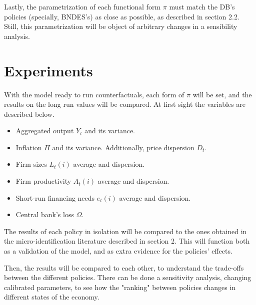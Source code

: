 \documentclass[12pt]{article}
\begin{document}
Lastly, the parametrization of each functional form $\pi$ must match the DB's policies (specially, BNDES's) as close as possible, as described in section 2.2. Still, this parametrization will be object of arbitrary changes in a sensibility analysis.



\section{Experiments}

With the model ready to run counterfactuals, each form of $\pi$ will be set, and the results on the long run values will be compared. At first sight the variables are described below.

\begin{itemize}
    \item Aggregated output $Y_t$ and its variance.
    \item Inflation $\Pi$ and its variance. Additionally, price dispersion $D_t$.
    \item Firm sizes $L_t(i)$ average and dispersion.
    \item Firm productivity $A_t(i)$ average and dispersion.
    \item Short-run financing needs $e_t(i)$ average and dispersion.
    \item Central bank's loss $\Omega$.
\end{itemize}

The results of each policy in isolation will be compared to the ones obtained in the micro-identification literature described in section 2. This will function both as a validation of the model, and as extra evidence for the policies' effects.

Then, the results will be compared to each other, to understand the trade-offs between the different policies. There can be done a sensitivity analysis, changing calibrated parameters, to see how the "ranking" between policies changes in different states of the economy.



\newpage
\printbibliography
\end{document}
